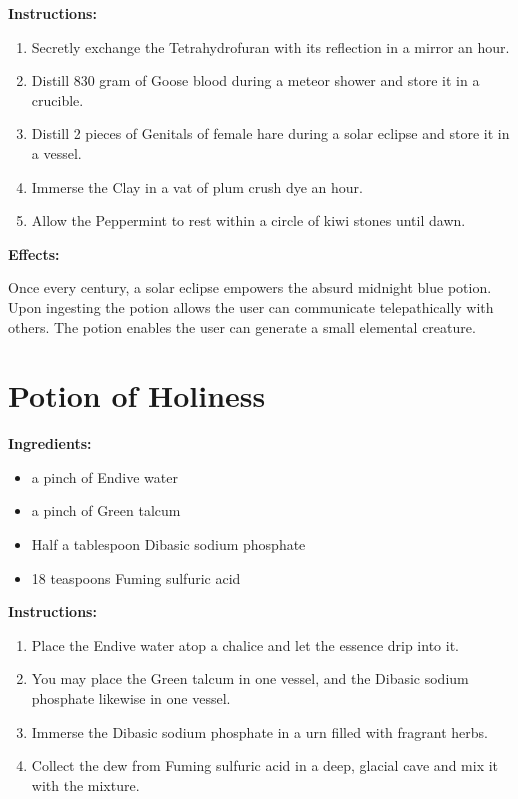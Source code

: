 \documentclass{article}
\begin{document}
\textbf{Instructions:}

\begin{enumerate}
  \item Secretly exchange the Tetrahydrofuran with its reflection in a mirror an hour.
  \item Distill 830 gram of Goose blood during a meteor shower and store it in a crucible.
  \item Distill 2 pieces of Genitals of female hare during a solar eclipse and store it in a vessel.
  \item Immerse the Clay in a vat of plum crush dye an hour.
  \item Allow the Peppermint to rest within a circle of kiwi stones until dawn.
\end{enumerate}

\textbf{Effects:}

Once every century, a solar eclipse empowers the absurd midnight blue potion. Upon ingesting the potion allows the user can communicate telepathically with others. The potion enables the user can generate a small elemental creature.

\newpage
\section*{Potion of Holiness}

\textbf{Ingredients:}

\begin{itemize}
  \item a pinch of Endive water
  \item a pinch of Green talcum
  \item Half a tablespoon Dibasic sodium phosphate
  \item 18 teaspoons Fuming sulfuric acid
\end{itemize}

\textbf{Instructions:}

\begin{enumerate}
  \item Place the Endive water atop a chalice and let the essence drip into it.
  \item You may place the Green talcum in one vessel, and the Dibasic sodium phosphate likewise in one vessel.
  \item Immerse the Dibasic sodium phosphate in a urn filled with fragrant herbs.
  \item Collect the dew from Fuming sulfuric acid in a deep, glacial cave and mix it with the mixture.
\end{enumerate}
\end{document}
